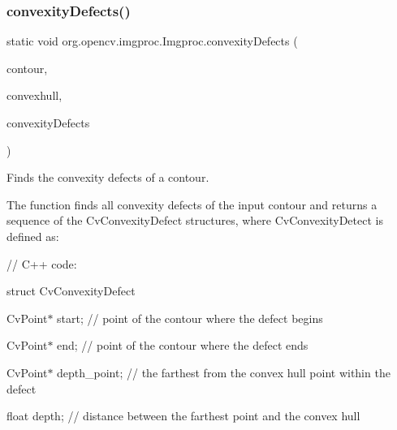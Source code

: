 \subsubsection{\texorpdfstring{convexity\+Defects()}{convexityDefects()}}
{\footnotesize\ttfamily static void org.\+opencv.\+imgproc.\+Imgproc.\+convexity\+Defects (\begin{DoxyParamCaption}\item[{\mbox{\hyperlink{classorg_1_1opencv_1_1core_1_1_mat_of_point}{Mat\+Of\+Point}}}]{contour,  }\item[{\mbox{\hyperlink{classorg_1_1opencv_1_1core_1_1_mat_of_int}{Mat\+Of\+Int}}}]{convexhull,  }\item[{\mbox{\hyperlink{classorg_1_1opencv_1_1core_1_1_mat_of_int4}{Mat\+Of\+Int4}}}]{convexity\+Defects }\end{DoxyParamCaption})\hspace{0.3cm}{\ttfamily [static]}}

Finds the convexity defects of a contour.

The function finds all convexity defects of the input contour and returns a sequence of the {\ttfamily Cv\+Convexity\+Defect} structures, where {\ttfamily Cv\+Convexity\+Detect} is defined as\+: {\ttfamily }

{\ttfamily }

{\ttfamily }

{\ttfamily // C++ code\+:}

{\ttfamily }

{\ttfamily }

{\ttfamily struct Cv\+Convexity\+Defect}

{\ttfamily }

{\ttfamily }

{\ttfamily Cv\+Point$\ast$ start; // point of the contour where the defect begins}

{\ttfamily }

{\ttfamily }

{\ttfamily Cv\+Point$\ast$ end; // point of the contour where the defect ends}

{\ttfamily }

{\ttfamily }

{\ttfamily Cv\+Point$\ast$ depth\+\_\+point; // the farthest from the convex hull point within the defect}

{\ttfamily }

{\ttfamily }

{\ttfamily float depth; // distance between the farthest point and the convex hull}

